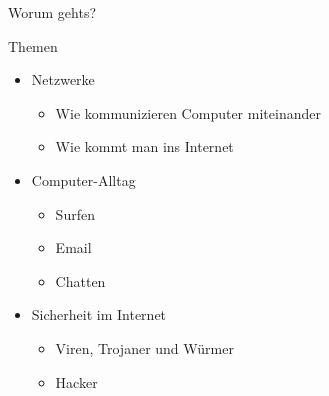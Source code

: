 

\begin{frame}{Worum gehts?}




\end{frame}


\begin{frame}{Themen}
\begin{itemize}
\item Netzwerke 
	  \begin{itemize}
	  \item Wie kommunizieren Computer miteinander
	  \item Wie kommt man ins Internet
	  \end{itemize}
\item Computer-Alltag
	  \begin{itemize}
	  \item Surfen
	  \item Email
	  \item Chatten
	  \end{itemize}
\item Sicherheit im Internet
	  \begin{itemize}
	  \item Viren, Trojaner und Würmer
	  \item Hacker
	  \end{itemize}
\end{itemize}
\end{frame}